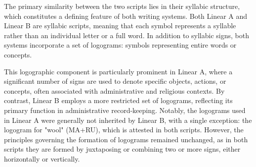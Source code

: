 The primary similarity between the two scripts lies in their syllabic structure, which constitutes a defining feature of both writing systems.
Both Linear A and Linear B are syllabic scripts, meaning that each symbol represents a syllable rather than an individual letter or a full word.
In addition to syllabic signs, both systems incorporate a set of logograms: symbols representing entire words or concepts.

This logographic component is particularly prominent in Linear A, where a significant number of signs are used to denote specific objects, actions, or concepts, often associated with administrative and religious contexts.
By contrast, Linear B employs a more restricted set of logograms, reflecting its primary function in administrative record-keeping.
Notably, the logograms used in Linear A were generally not inherited by Linear B, with a single exception: the logogram for "wool" (MA+RU), which is attested in both scripts.
However, the principles governing the formation of logograms remained unchanged, as in both scripts they are formed by juxtaposing or combining two or more signs, either horizontally or vertically.
